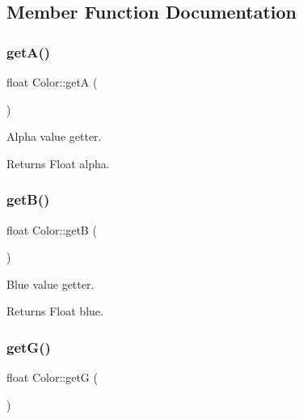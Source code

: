 \subsection{Member Function Documentation}
\mbox{\label{classColor_a3bd02605f19eb70590822131bcdd8b08}} 
\subsubsection{\texorpdfstring{get\+A()}{getA()}}
{\footnotesize\ttfamily float Color\+::getA (\begin{DoxyParamCaption}{ }\end{DoxyParamCaption})\hspace{0.3cm}{\ttfamily [inline]}}



Alpha value getter. 

\begin{DoxyReturn}{Returns}
Float alpha. 
\end{DoxyReturn}
\mbox{\label{classColor_a099852b0829e9551169a90768146e61e}} 
\subsubsection{\texorpdfstring{get\+B()}{getB()}}
{\footnotesize\ttfamily float Color\+::getB (\begin{DoxyParamCaption}{ }\end{DoxyParamCaption})\hspace{0.3cm}{\ttfamily [inline]}}



Blue value getter. 

\begin{DoxyReturn}{Returns}
Float blue. 
\end{DoxyReturn}
\mbox{\label{classColor_a5c32d43f4405ace1cdb1cd0e32593e1a}} 
\subsubsection{\texorpdfstring{get\+G()}{getG()}}
{\footnotesize\ttfamily float Color\+::getG (\begin{DoxyParamCaption}{ }\end{DoxyParamCaption})\hspace{0.3cm}{\ttfamily [inline]}}



